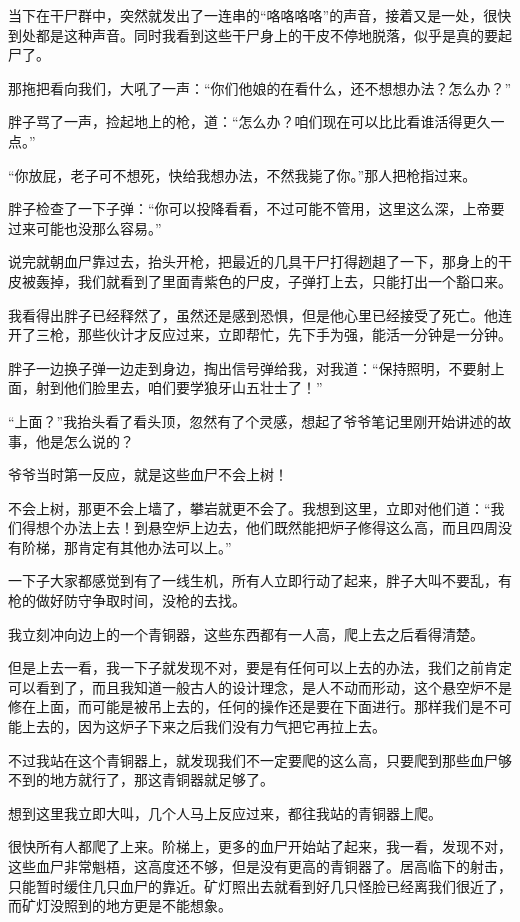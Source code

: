 当下在干尸群中，突然就发出了一连串的“咯咯咯咯”的声音，接着又是一处，很快到处都是这种声音。同时我看到这些干尸身上的干皮不停地脱落，似乎是真的要起尸了。

那拖把看向我们，大吼了一声：“你们他娘的在看什么，还不想想办法？怎么办？”

胖子骂了一声，捡起地上的枪，道：“怎么办？咱们现在可以比比看谁活得更久一点。”

“你放屁，老子可不想死，快给我想办法，不然我毙了你。”那人把枪指过来。

胖子检查了一下子弹：“你可以投降看看，不过可能不管用，这里这么深，上帝要过来可能也没那么容易。”

说完就朝血尸靠过去，抬头开枪，把最近的几具干尸打得趔趄了一下，那身上的干皮被轰掉，我们就看到了里面青紫色的尸皮，子弹打上去，只能打出一个豁口来。

我看得出胖子已经释然了，虽然还是感到恐惧，但是他心里已经接受了死亡。他连开了三枪，那些伙计才反应过来，立即帮忙，先下手为强，能活一分钟是一分钟。

胖子一边换子弹一边走到身边，掏出信号弹给我，对我道：“保持照明，不要射上面，射到他们脸里去，咱们要学狼牙山五壮士了！”

“上面？”我抬头看了看头顶，忽然有了个灵感，想起了爷爷笔记里刚开始讲述的故事，他是怎么说的？

爷爷当时第一反应，就是这些血尸不会上树！

不会上树，那更不会上墙了，攀岩就更不会了。我想到这里，立即对他们道：“我们得想个办法上去！到悬空炉上边去，他们既然能把炉子修得这么高，而且四周没有阶梯，那肯定有其他办法可以上。”

一下子大家都感觉到有了一线生机，所有人立即行动了起来，胖子大叫不要乱，有枪的做好防守争取时间，没枪的去找。

我立刻冲向边上的一个青铜器，这些东西都有一人高，爬上去之后看得清楚。

但是上去一看，我一下子就发现不对，要是有任何可以上去的办法，我们之前肯定可以看到了，而且我知道一般古人的设计理念，是人不动而形动，这个悬空炉不是修在上面，而可能是被吊上去的，任何的操作还是要在下面进行。那样我们是不可能上去的，因为这炉子下来之后我们没有力气把它再拉上去。

不过我站在这个青铜器上，就发现我们不一定要爬的这么高，只要爬到那些血尸够不到的地方就行了，那这青铜器就足够了。

想到这里我立即大叫，几个人马上反应过来，都往我站的青铜器上爬。

很快所有人都爬了上来。阶梯上，更多的血尸开始站了起来，我一看，发现不对，这些血尸非常魁梧，这高度还不够，但是没有更高的青铜器了。居高临下的射击，只能暂时缓住几只血尸的靠近。矿灯照出去就看到好几只怪脸已经离我们很近了，而矿灯没照到的地方更是不能想象。


